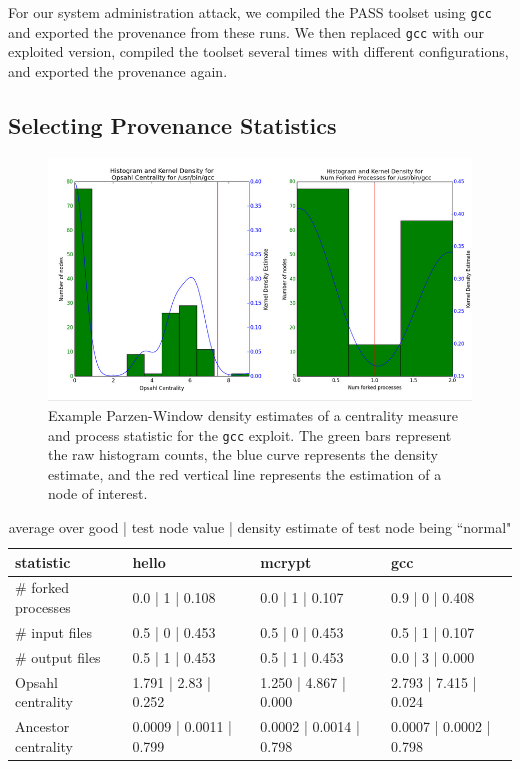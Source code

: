 \documentclass[10pt,twocolumn]{article}
\begin{document}
For our system administration attack, we compiled the PASS toolset using \texttt{gcc} and exported the provenance from these runs. We then replaced \texttt{gcc} with our exploited version, compiled the toolset several times with different configurations, and exported the provenance again.

\subsection{Selecting Provenance Statistics}

\begin{figure}
  \label{kde-example}
  \centering
    \includegraphics[width=\textwidth]{img/hist.png}
      \caption{Example Parzen-Window density estimates of a centrality measure and process statistic for the \texttt{gcc} exploit. The green bars represent the raw histogram counts, the blue curve represents the density estimate, and the red vertical line represents the estimation of a node of interest.}
\end{figure}

\begin{table}[ht]
\label{results}
{\small
  \begin{center}
  \begin{tabular}{| l | l | l | l |}
    \hline
    statistic & hello & mcrypt & gcc \\ \hline
     \# forked processes & 0.0 | 1 | 0.108 & 0.0 | 1 | 0.107 & 0.9 | 0 | 0.408 \\ \hline
     \# input files & 0.5 | 0 | 0.453 & 0.5 | 0 | 0.453 & 0.5 | 1 | 0.107 \\ \hline
     \# output files & 0.5 | 1 | 0.453 & 0.5 | 1 | 0.453 & 0.0 | 3 | 0.000 \\ \hline
    Opsahl centrality & 1.791 | 2.83 | 0.252 & 1.250 | 4.867 | 0.000 & 2.793 | 7.415 | 0.024 \\ \hline
    Ancestor centrality & 0.0009 | 0.0011 | 0.799 & 0.0002 | 0.0014 | 0.798 & 0.0007 | 0.0002 | 0.798 \\

    \hline
  \end{tabular}
  \end{center}
}
\hfill{}
\caption{average over good | test node value | density estimate of test node being ``normal"
}
\label{tb:tablename}
\end{table}
\end{document}

